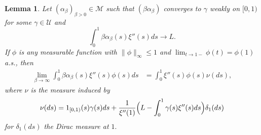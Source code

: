 \documentclass[12pt]{article}
\newtheorem{lemma}{\bf Lemma}
\newenvironment{Proof of lemma}{\noindent{\bf Proof of Lemma}}{\hfill$\Box$\newline}
\newenvironment{Proof of theorem}{\noindent{\bf Proof of Theorem}}{\hfill{\footnotesize${\square}$}\newline}
\newenvironment{Proof of theorems}{\noindent{\bf Proof of Theorems}}{\hfill$\Box$\newline}
\newenvironment{Proof of proposition}{\noindent{\bf Proof of Proposition}}{\hfill$\Box$\newline}
\newenvironment{Proof of propositions}{\noindent{\bf Proof of Propositions}}{\hfill$\Box$\newline}
\newenvironment{Proof of exercise}{\noindent{\it Proof of Exercise:}}{\hfill$\Box$}
\begin{document}
\begin{lemma}\label{lem3}
	Let $(\alpha_\beta)_{\beta>0}\in\mathcal{M}$ such that $(\beta\alpha_\beta)$ converges to $\gamma  $ weakly on $[0,1)$ for some $\gamma\in\mathcal{U}$ and $$
	\int_0^1\beta\alpha_\beta(s)\xi''(s)ds\rightarrow L.$$ If $\phi$ is any measurable function with $\|\phi\|_\infty\leq 1$ and $\lim_{t\rightarrow 1-}\phi(t)=\phi(1)$ a.s., then
	\begin{align*}
	\lim_{\beta\rightarrow\infty}\int_0  ^1\beta\alpha_\beta(s)\xi''(s)\phi(s)ds&=\int_0  ^1\xi''(s)\phi(s)\nu  (ds),
	\end{align*}  
	where $\nu  $ is the measure induced by $$
	\nu  (ds)=1_{[0,1)}(s)\gamma  (s)ds+\frac{1}{\xi''(1)}\Bigl(L  -\int_0  ^1\gamma  (s)\xi''(s)ds\Bigr)\delta_1(ds)
	$$
	for $\delta_1(ds)$ the Dirac measure at $1.$
\end{lemma}
\end{document}

